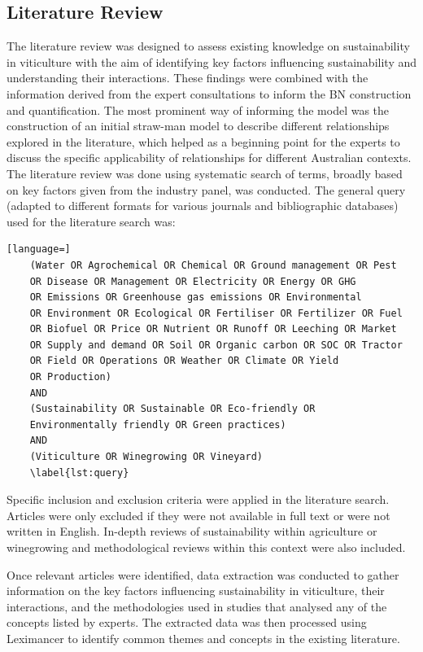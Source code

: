 \documentclass[fleqn,10pt]{wlscirep}
\begin{document}
\subsection*{Literature Review}

The literature review was designed to assess existing knowledge on sustainability in viticulture with the aim of identifying key factors influencing sustainability and understanding their interactions. These findings were combined with the information derived from the expert consultations to inform the BN construction and quantification. The most prominent way of informing the model was the construction of an initial straw-man model to describe different relationships explored in the literature, which helped as a beginning point for the experts to discuss the specific applicability of relationships for different Australian contexts. The literature review was done using systematic search of terms, broadly based on key factors given from the industry panel, was conducted. The general query (adapted to different formats for various journals and bibliographic databases) used for the literature search was: 

\begin{lstlisting}[language=]
    (Water OR Agrochemical OR Chemical OR Ground management OR Pest
    OR Disease OR Management OR Electricity OR Energy OR GHG
    OR Emissions OR Greenhouse gas emissions OR Environmental
    OR Environment OR Ecological OR Fertiliser OR Fertilizer OR Fuel
    OR Biofuel OR Price OR Nutrient OR Runoff OR Leeching OR Market
    OR Supply and demand OR Soil OR Organic carbon OR SOC OR Tractor
    OR Field OR Operations OR Weather OR Climate OR Yield
    OR Production)
    AND
    (Sustainability OR Sustainable OR Eco-friendly OR
    Environmentally friendly OR Green practices)
    AND
    (Viticulture OR Winegrowing OR Vineyard)
    \label{lst:query}
\end{lstlisting}

Specific inclusion and exclusion criteria were applied in the literature search. Articles were only excluded if they were not available in full text or were not written in English. In-depth reviews of sustainability within agriculture or winegrowing and methodological reviews within this context were also included.

Once relevant articles were identified, data extraction was conducted to gather information on the key factors influencing sustainability in viticulture, their interactions, and the methodologies used in studies that analysed any of the concepts listed by experts. The extracted data was then processed using Leximancer to identify common themes and concepts in the existing literature.
\end{document}
